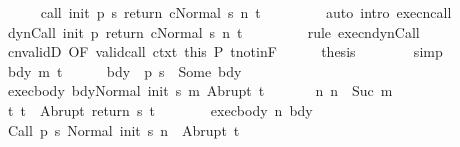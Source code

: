 \begin{isabellebody}
\ \ \ \ \isamarkupfalse%
\ {\isachardoublequoteopen}{\isasymGamma}{\isasymturnstile}{\isasymlangle}call\ init\ {\isacharparenleft}p\ s{\isacharparenright}\ return{\isacharprime}\ c{\isacharcomma}Normal\ s{\isasymrangle}\ {\isacharequal}n{\isasymRightarrow}\ t{\isachardoublequoteclose}\ \isanewline
\ \ \ \ \ \ \isamarkupfalse%
\ {\isacharparenleft}auto\ intro{\isacharcolon}\ execn{\isacharunderscore}call{\isacharparenright}\isanewline
\ \ \ \ \isamarkupfalse%
\ {\isachardoublequoteopen}{\isasymGamma}{\isasymturnstile}{\isasymlangle}dynCall\ init\ p\ return{\isacharprime}\ c{\isacharcomma}Normal\ s{\isasymrangle}\ {\isacharequal}n{\isasymRightarrow}\ t{\isachardoublequoteclose}\ \isanewline
\ \ \ \ \ \ \isamarkupfalse%
\ {\isacharparenleft}rule\ execn{\isacharunderscore}dynCall{\isacharparenright}\isanewline
\ \ \ \ \isamarkupfalse%
\ cnvalidD\ {\isacharbrackleft}OF\ valid{\isacharunderscore}call\ ctxt\ this{\isacharbrackright}\ P\ t{\isacharunderscore}notin{\isacharunderscore}F\isanewline
\ \ \ \ \isamarkupfalse%
\ {\isacharquery}thesis\isanewline
\ \ \ \ \ \ \isamarkupfalse%
\ simp\isanewline
\ \ \isamarkupfalse%
\isanewline
\ \ \ \ \isamarkupfalse%
\ bdy\ m\ t{\isacharprime}\isanewline
\ \ \ \ \isamarkupfalse%
\ bdy{\isacharcolon}\ {\isachardoublequoteopen}{\isasymGamma}\ {\isacharparenleft}p\ s{\isacharparenright}\ {\isacharequal}\ Some\ bdy{\isachardoublequoteclose}\isanewline
\ \ \ \ \isamarkupfalse%
\ exec{\isacharunderscore}body{\isacharcolon}\ {\isachardoublequoteopen}{\isasymGamma}{\isasymturnstile}{\isasymlangle}bdy{\isacharcomma}Normal\ {\isacharparenleft}init\ s{\isacharparenright}{\isasymrangle}\ {\isacharequal}m{\isasymRightarrow}\ Abrupt\ t{\isacharprime}{\isachardoublequoteclose}\ \isanewline
\ \ \ \ \isamarkupfalse%
\ n{\isacharcolon}\ {\isachardoublequoteopen}n\ {\isacharequal}\ Suc\ m{\isachardoublequoteclose}\isanewline
\ \ \ \ \isamarkupfalse%
\ t{\isacharcolon}\ {\isachardoublequoteopen}t\ {\isacharequal}\ Abrupt\ {\isacharparenleft}return\ s\ t{\isacharprime}{\isacharparenright}{\isachardoublequoteclose}\isanewline
\ \ \ \ \isamarkupfalse%
\ \isamarkupfalse%
\ exec{\isacharunderscore}body\ n\ bdy\isanewline
\ \ \ \ \isamarkupfalse%
\ {\isachardoublequoteopen}{\isasymGamma}{\isasymturnstile}{\isasymlangle}Call\ {\isacharparenleft}p\ s{\isacharparenright}\ {\isacharcomma}Normal\ {\isacharparenleft}init\ s{\isacharparenright}{\isasymrangle}\ {\isacharequal}n\ {\isasymRightarrow}\ Abrupt\ t{\isacharprime}{\isachardoublequoteclose}\isanewline

\end{isabellebody}
